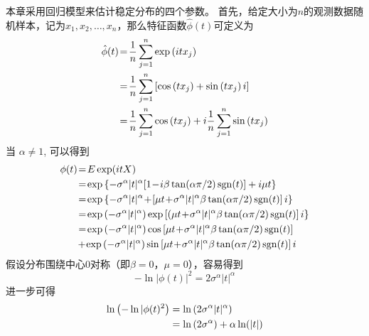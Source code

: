 本章采用回归模型来估计稳定分布的四个参数。
首先，给定大小为$n$的观测数据随机样本，记为$x_1, x_2, \ldots, x_n$，那么特征函数$\hat{\phi}(t)$可定义为
\begin{align}
	\hat{\phi}(t)&\!=\!\frac{1}{n} \sum_{j=1}^{n} \exp \left(i t x_{j}\right) \notag \\
	&\!=\!\frac{1}{n} \sum_{j=1}^{n}\left[\cos \left(t x_{j}\right)+\sin \left(t x_{j}\right) i\right] \notag \\
	&\!=\!\frac{1}{n} \sum_{j=1}^{n} \cos \left(t x_{j}\right)+i \frac{1}{n} \sum_{j=1}^{n} \sin \left(t x_{j}\right)
\end{align}
当 $\alpha \neq 1$, 可以得到
\begin{align}
	\phi(t) 
	&\!=\!E \exp (i t X) \notag \\ 
	&\!=\!\exp \left\{-\sigma^{\alpha}|t|^{\alpha}[1\!-\!i \beta \tan (\alpha \pi / 2) \operatorname{sgn}(t)]+i \mu t\right\} \notag \\ 
	&\!=\!\exp \left\{-\sigma^{\alpha}|t|^{\alpha}\!+\!\left[\mu t\!+\!\sigma^{\alpha}|t|^{\alpha} \beta \tan (\alpha \pi / 2) \operatorname{sgn}(t)\right] i\right\} \notag \\  
	&\!=\!\exp \left(-\sigma^{\alpha}|t|^{\alpha}\right) \exp \left[\left(\mu t\!+\!\sigma^{\alpha}|t|^{\alpha} \beta \tan (\alpha \pi / 2) \operatorname{sgn}(t)\right] i\right\} \notag \\ 
	&\!=\!\exp \left(-\sigma^{\alpha}|t|^{\alpha}\right) \cos \left[\mu t\!+\!\sigma^{\alpha}|t|^{\alpha} \beta \tan (\alpha \pi / 2) \operatorname{sgn}(t)\right] \notag \\ 
	&\!+\!\exp \left(-\sigma^{\alpha}|t|^{\alpha}\right) \sin \left[\mu t\!+\!\sigma^{\alpha}|t|^{\alpha} \beta \tan (\alpha \pi / 2) \operatorname{sgn}(t)\right] i 
\label{equ 5-5}
\end{align}
假设分布围绕中心$0$对称（即$\beta = 0$，$\mu = 0$），容易得到
\begin{equation}
	-\ln |\phi(t)|^{2}=2 \sigma^{\alpha}|t|^{\alpha}
\end{equation}
进一步可得
\begin{align} 
	\ln \left(-\ln | \phi(t)^{2}\right)
	&= \ln \left(2 \sigma^{\alpha}|t|^{\alpha}\right) \notag \\ 
	&=\ln \left(2 \sigma^{\alpha}\right)+\alpha \ln (|t|) 
\end{align}



